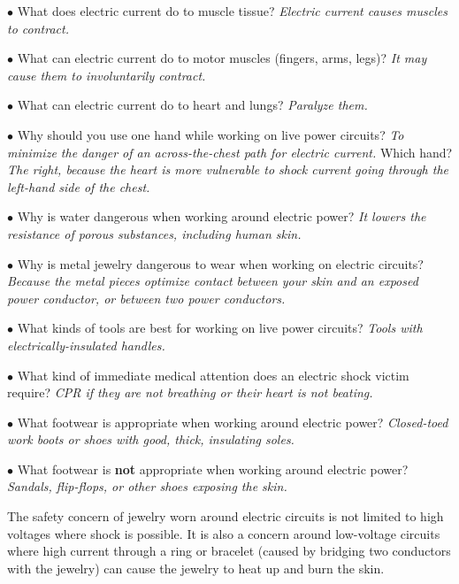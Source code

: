 \medskip
\item{$\bullet$} What does electric current do to muscle tissue?  {\it Electric current causes muscles to contract.}
\item{$\bullet$} What can electric current do to motor muscles (fingers, arms, legs)?  {\it It may cause them to involuntarily contract.}
\item{$\bullet$} What can electric current do to heart and lungs?  {\it Paralyze them.}
\item{$\bullet$} Why should you use one hand while working on live power circuits?  {\it To minimize the danger of an across-the-chest path for electric current.}  Which hand?  {\it The right, because the heart is more vulnerable to shock current going through the left-hand side of the chest.}
\item{$\bullet$} Why is water dangerous when working around electric power?  {\it It lowers the resistance of porous substances, including human skin.}
\item{$\bullet$} Why is metal jewelry dangerous to wear when working on electric circuits?  {\it Because the metal pieces optimize contact between your skin and an exposed power conductor, or between two power conductors.}
\item{$\bullet$} What kinds of tools are best for working on live power circuits?  {\it Tools with electrically-insulated handles.}
\item{$\bullet$} What kind of immediate medical attention does an electric shock victim require?  {\it CPR if they are not breathing or their heart is not beating.}
\item{$\bullet$} What footwear is appropriate when working around electric power?  {\it Closed-toed work boots or shoes with good, thick, insulating soles.}
\item{$\bullet$} What footwear is {\bf not} appropriate when working around electric power?  {\it Sandals, flip-flops, or other shoes exposing the skin.}
\medskip







The safety concern of jewelry worn around electric circuits is not limited to high voltages where shock is possible.  It is also a concern around low-voltage circuits where high current through a ring or bracelet (caused by bridging two conductors with the jewelry) can cause the jewelry to heat up and burn the skin.




